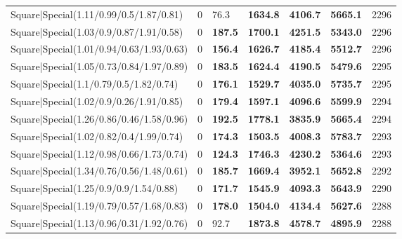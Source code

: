 \begin{tabular}{lrllllr}
 Square|Special(1.11/0.99/0.5/1.87/0.81)                       &             0   & 76.3           & \textbf{1634.8} & \textbf{4106.7} & \textbf{5665.1} &         2296 \\
 Square|Special(1.03/0.9/0.87/1.91/0.58)                       &             0   & \textbf{187.5} & \textbf{1700.1} & \textbf{4251.5} & \textbf{5343.0} &         2296 \\
 Square|Special(1.01/0.94/0.63/1.93/0.63)                      &             0   & \textbf{156.4} & \textbf{1626.7} & \textbf{4185.4} & \textbf{5512.7} &         2296 \\
 Square|Special(1.05/0.73/0.84/1.97/0.89)                      &             0   & \textbf{183.5} & \textbf{1624.4} & \textbf{4190.5} & \textbf{5479.6} &         2295 \\
 Square|Special(1.1/0.79/0.5/1.82/0.74)                        &             0   & \textbf{176.1} & \textbf{1529.7} & \textbf{4035.0} & \textbf{5735.7} &         2295 \\
 Square|Special(1.02/0.9/0.26/1.91/0.85)                       &             0   & \textbf{179.4} & \textbf{1597.1} & \textbf{4096.6} & \textbf{5599.9} &         2294 \\
 Square|Special(1.26/0.86/0.46/1.58/0.96)                      &             0   & \textbf{192.5} & \textbf{1778.1} & \textbf{3835.9} & \textbf{5665.4} &         2294 \\
 Square|Special(1.02/0.82/0.4/1.99/0.74)                       &             0   & \textbf{174.3} & \textbf{1503.5} & \textbf{4008.3} & \textbf{5783.7} &         2293 \\
 Square|Special(1.12/0.98/0.66/1.73/0.74)                      &             0   & \textbf{124.3} & \textbf{1746.3} & \textbf{4230.2} & \textbf{5364.6} &         2293 \\
 Square|Special(1.34/0.76/0.56/1.48/0.61)                      &             0   & \textbf{185.7} & \textbf{1669.4} & \textbf{3952.1} & \textbf{5652.8} &         2292 \\
 Square|Special(1.25/0.9/0.9/1.54/0.88)                        &             0   & \textbf{171.7} & \textbf{1545.9} & \textbf{4093.3} & \textbf{5643.9} &         2290 \\
 Square|Special(1.19/0.79/0.57/1.68/0.83)                      &             0   & \textbf{178.0} & \textbf{1504.0} & \textbf{4134.4} & \textbf{5627.6} &         2288 \\
 Square|Special(1.13/0.96/0.31/1.92/0.76)                      &             0   & 92.7           & \textbf{1873.8} & \textbf{4578.7} & \textbf{4895.9} &         2288 \\

\end{tabular}
